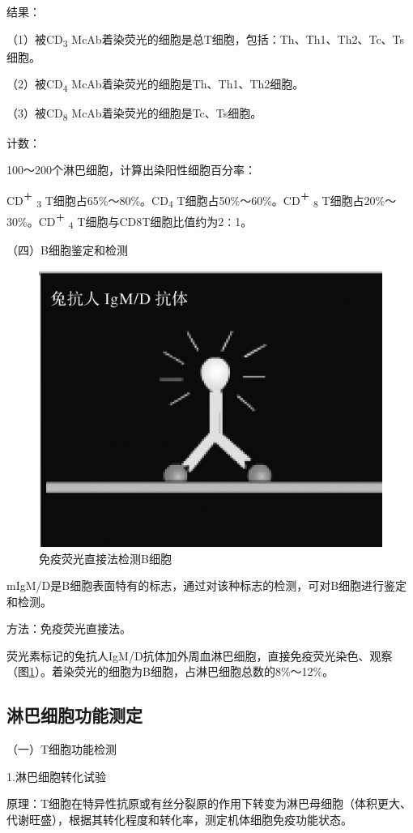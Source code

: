 结果：

（1）被CD\textsubscript{3}
McAb着染荧光的细胞是总T细胞，包括：Th、Th1、Th2、Tc、Ts细胞。

（2）被CD\textsubscript{4} McAb着染荧光的细胞是Th、Th1、Th2细胞。

（3）被CD\textsubscript{8} McAb着染荧光的细胞是Tc、Ts细胞。

计数：

100～200个淋巴细胞，计算出染阳性细胞百分率：

CD\textsuperscript{＋} \textsubscript{3}
T细胞占65\%～80\%。CD\textsubscript{4}
T细胞占50\%～60\%。CD\textsuperscript{＋} \textsubscript{8}
T细胞占20\%～30\%。CD\textsuperscript{＋} \textsubscript{4}
T细胞与CD8T细胞比值约为2∶1。

（四）B细胞鉴定和检测

\begin{figure}[!htbp]
 \centering
 \includegraphics[width=.5\textwidth]{./images/Image00179.jpg}
 \captionsetup{justification=centering}
 \caption{免疫荧光直接法检测B细胞}
 \label{fig10-25}
  \end{figure} 

mIgM/D是B细胞表面特有的标志，通过对该种标志的检测，可对B细胞进行鉴定和检测。

方法：免疫荧光直接法。

荧光素标记的兔抗人IgM/D抗体加外周血淋巴细胞，直接免疫荧光染色、观察（图\ref{fig10-25}）。着染荧光的细胞为B细胞，占淋巴细胞总数的8\%～12\%。


\subsection{淋巴细胞功能测定}

（一）T细胞功能检测

1.淋巴细胞转化试验

原理：T细胞在特异性抗原或有丝分裂原的作用下转变为淋巴母细胞（体积更大、代谢旺盛），根据其转化程度和转化率，测定机体细胞免疫功能状态。

